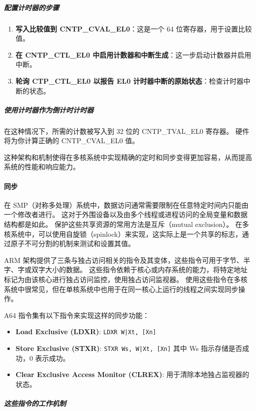 \subparagraph*{配置计时器的步骤}

\begin{enumerate}
  \item
    \textbf{写入比较值到 CNTP\_CVAL\_EL0}：这是一个 64 位寄存器，用于设置比较值。
  \item
    \textbf{在 CNTP\_CTL\_EL0 中启用计数器和中断生成}：这一步启动计数器并启用中断。
  \item
    \textbf{轮询 CTP\_CTL\_EL0 以报告 EL0 计时器中断的原始状态}：检查计时器中断的状态。
\end{enumerate}

\subparagraph*{使用计时器作为倒计时计时器}

在这种情况下，所需的计数被写入到 32 位的 CNTP\_TVAL\_EL0 寄存器。
硬件将为你计算正确的 CNTP\_CVAL\_EL0 值。

这种架构和机制使得在多核系统中实现精确的定时和同步变得更加容易，从而提高系统的性能和响应能力。

\paragraph{同步}

在 SMP（对称多处理）系统中，数据访问通常需要限制在任意特定时间内只能由一个修改者进行。
这对于外围设备以及由多个线程或进程访问的全局变量和数据结构都是如此。
保护这些共享资源的常用方法是互斥（mutual exclusion）。
在多核系统中，可以使用自旋锁（spinlock）来实现，这实际上是一个共享的标志，通过原子不可分割的机制来测试和设置其值。

ARM 架构提供了三条与独占访问相关的指令及其变体，这些指令可用于字节、半字、字或双字大小的数据。
这些指令依赖于核心或内存系统的能力，将特定地址标记为由该核心进行独占访问监控，使用独占访问监视器。
使用这些指令在多核系统中很常见，但在单核系统中也用于在同一核心上运行的线程之间实现同步操作。

A64 指令集有以下指令来实现这样的同步功能：

\begin{itemize}
\item
  \textbf{Load Exclusive (LDXR)}:
  {\lstinline!LDXR W|Xt, [Xn]!}
\item
  \textbf{Store Exclusive (STXR)}:
  {\lstinline!STXR Ws, W|Xt, [Xn]!}
  其中 Ws 指示存储是否成功，0 表示成功。
\item
  \textbf{Clear Exclusive Access Monitor (CLREX)}:
  用于清除本地独占监视器的状态。
\end{itemize}

\subparagraph*{这些指令的工作机制}

